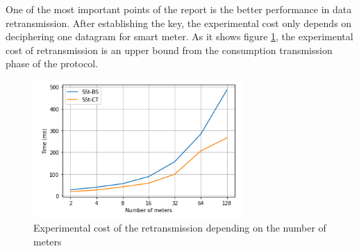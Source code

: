 
	One of the most important points of the report is the better performance in data retransmission. After establishing the key, the experimental cost only depends on deciphering one datagram for smart meter. As it shows figure \ref{fig:busom}, the experimental cost of \cite{busom} retransmission is an upper bound from the consumption transmission phase of the protocol.
	\begin{figure}[h!]
		\centering
		\includegraphics[width=8cm]{imgs/exp-cost-subst.png}
		\caption{Experimental cost of the retransmission depending on the number of meters}
		\label{fig:busom}
	\end{figure}


